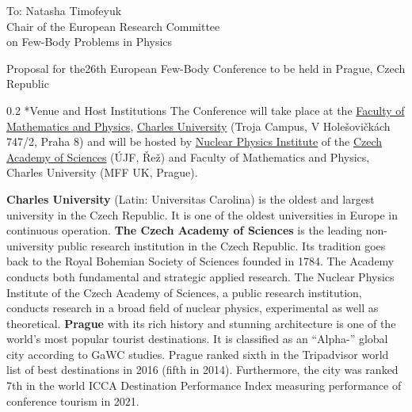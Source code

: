\documentclass[12pt]{extarticle}
\makeatletter
\renewcommand{\section}{\@startsection{section}{1}{0mm}
{1.0\baselineskip}%
{0.2\baselineskip}%
{\normalfont\large\bfseries}}%
\makeatother
\begin{document}
\color{C0}


\noindent
To: Natasha Timofeyuk \\
Chair of the European Research Committee \\
on Few-Body Problems in Physics

\bigskip\bigskip

\noindent
\doublespacing
{\color{C4}\selectfont%
  \LARGE Proposal for the\newline 26th
  European Few-Body Conference\newline
  to be held in Prague, Czech Republic%
}

\bigskip

\onehalfspacing
\section*{Venue and Host Institutions}
\noindent
%
The Conference will take place at the
\href{https://www.mff.cuni.cz/en}{Faculty of Mathematics and Physics},
\href{https://cuni.cz/UKEN-1.html}{Charles University} (Troja Campus,
V Holešovičkách 747/2, Praha 8) and will be hosted by
\href{http://www.ujf.cas.cz/en/}{Nuclear Physics Institute} of the
\href{https://www.avcr.cz/en/}{Czech Academy of Sciences} (ÚJF, Řež)
and Faculty of Mathematics and Physics, Charles University (MFF UK,
Prague).

\textbf{Charles University} (Latin: Universitas Carolina) is the oldest and
largest university in the Czech Republic. It is one of the oldest
universities in Europe in continuous operation.
% 
\textbf{The Czech Academy of Sciences} is the leading non-university public
research institution in the Czech Republic. Its tradition goes back to
the Royal Bohemian Society of Sciences founded in 1784. The Academy
conducts both fundamental and strategic applied research. The
  Nuclear Physics Institute of the Czech Academy of Sciences, a
public research institution, conducts research in a broad field of
nuclear physics, experimental as well as theoretical.
% 
\textbf{Prague} with its rich history and stunning architecture is one of the
world's most popular tourist destinations. It is classified as an
``Alpha-{}'' global city according to GaWC studies. Prague ranked sixth
in the Tripadvisor world list of best destinations in 2016 (fifth in
2014). Furthermore, the city was ranked 7th in the world ICCA
Destination Performance Index measuring performance of conference
tourism in 2021.
\end{document}

